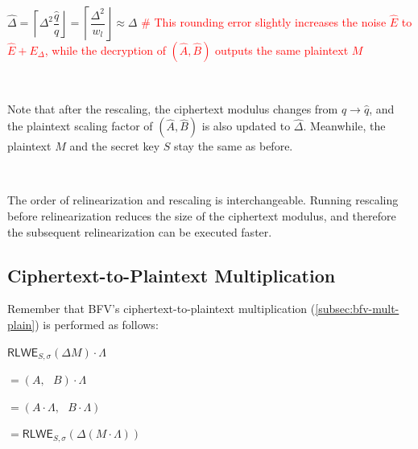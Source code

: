 \begin{tcolorbox}[title={\textbf{\tboxlabel{\ref*{subsubsec:ckks-mult-cipher-summary}} CKKS's Ciphertext-to-Ciphertext Multiplication}}]
\begin{enumerate}
$\hat{\Delta} = \left\lceil\Delta^2\dfrac{\hat{q}}{q}\right\rfloor = \left\lceil\dfrac{\Delta^2}{w_l}\right\rfloor \approx \Delta$ \textcolor{red}{ \# This rounding error slightly increases the noise $\hat E$ to $\hat E + E_\Delta$, while the decryption of $(\hat A, \hat B)$ outputs the same plaintext $M$}

$ $


Note that after the rescaling, the ciphertext modulus changes from $q \rightarrow \hat q$, and the plaintext scaling factor of $(\hat A, \hat B)$ is also updated to $\hat{\Delta}$. Meanwhile, the plaintext $M$ and the secret key $S$ stay the same as before.

$ $

\end{enumerate}

 The order of relinearization and rescaling is interchangeable. Running rescaling before relinearization reduces the size of the ciphertext modulus, and therefore the subsequent relinearization can be executed faster. 

\end{tcolorbox}


\subsection{Ciphertext-to-Plaintext Multiplication}
\label{subsec:ckks-mult-plain}

Remember that BFV's ciphertext-to-plaintext multiplication (\autoref{subsec:bfv-mult-plain}) is performed as follows:

$\textsf{RLWE}_{S, \sigma}(\Delta M) \cdot \Lambda$

$= (A, \text{ } B) \cdot \Lambda$

$= (A \cdot \Lambda, \text{ }  B \cdot \Lambda )$

$= \textsf{RLWE}_{S, \sigma}(\Delta (M \cdot \Lambda) )$

